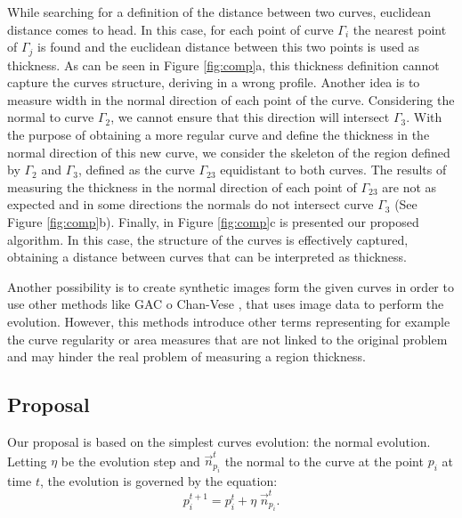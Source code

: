 \documentclass{article}
\begin{document}
While searching for a definition of the distance between two curves, euclidean distance comes to head. In this case, for each point of curve $\Gamma_i$ the nearest point of $\Gamma_j$ is found and the euclidean distance between this two points is used as thickness. As can be seen in Figure \ref{fig:comp}a, this thickness definition cannot capture the curves structure, deriving in a wrong profile. Another idea is to measure width in the normal direction of each point of the curve. Considering the normal to curve $\Gamma_2$, we cannot ensure that this direction will intersect $\Gamma_3$. With the purpose of obtaining a more regular curve and define the thickness in the normal direction of this new curve, we consider the skeleton of the region defined by $\Gamma_2$ and $\Gamma_3$, defined as the curve $\Gamma_{23}$ equidistant to both curves. The results of measuring the thickness in the normal direction of each point of $\Gamma_{23}$ are not as expected and in some directions the normals do not intersect curve $\Gamma_3$ (See Figure \ref{fig:comp}b). Finally, in Figure \ref{fig:comp}c is presented our proposed algorithm. In this case, the structure of the curves is effectively captured, obtaining a distance between curves that can be interpreted as thickness.

Another possibility is to create synthetic images form the given curves in order to use other methods like GAC \cite{gac} o Chan-Vese \cite{chan-vese}, that uses image data to perform the evolution. However, this methods introduce other terms representing for example the curve regularity or area measures that are not linked to the original problem and may hinder the real problem of measuring a region thickness. 

\subsection{Proposal}
\label{ssec:proposal}
Our proposal is based on the simplest curves evolution: the normal evolution. Letting $\eta$ be the evolution step and $\vec{n}_{p_i}^t$ the normal to the curve at the point $p_i$ at time $t$, the evolution is governed by the equation:
\begin{equation}
  p_i^{t+1}=p_i^t+\eta \; \vec{n}_{p_i}^t.
  \label{ec:normal}
\end{equation}
\end{document}
